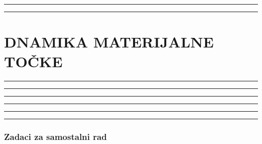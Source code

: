 \documentclass[10pt]{book}
\newcounter{zadatak} %
\newcounter{cjelina}
\begin{document}

\noindent
{\color{boja} \rule{\linewidth}{0.3mm} }

\vspace{0.2cm}




\noindent
{\color{boja} \rule{\linewidth}{0.3mm} }


\setcounter{zadatak}{0}

\newpage
\chapter{DNAMIKA MATERIJALNE TOČKE}


\noindent
{\color{boja} \rule{\linewidth}{0.3mm} }

\vspace{0.2cm} 



\noindent
{\color{boja} \rule{\linewidth}{0.3mm} }

\vspace{0.2cm}




\noindent
{\color{boja} \rule{\linewidth}{0.3mm} }


\setcounter{zadatak}{0}



\noindent
{\color{boja} \rule{\linewidth}{0.3mm} }

\vspace{0.2cm} 



\noindent
{\color{boja} \rule{\linewidth}{0.3mm} }

\vspace{0.2cm}




\noindent
{\color{boja} \rule{\linewidth}{0.3mm} }


\subsection*{Zadaci za samostalni rad}
\end{document}

